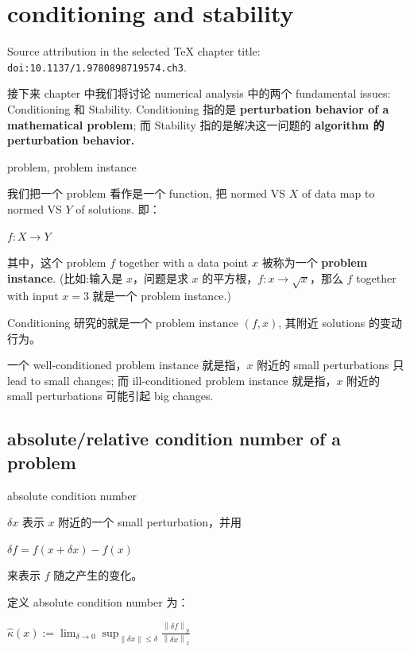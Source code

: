 \chapter{conditioning and stability}

Source attribution in the selected TeX chapter title: \texttt{doi:10.1137/1.9780898719574.ch3}.

接下来 chapter 中我们将讨论 numerical analysis 中的两个 fundamental issues: Conditioning 和 Stability. Conditioning 指的是 \textbf{perturbation behavior of a mathematical problem}; 而 Stability 指的是解决这一问题的 \textbf{algorithm 的 perturbation behavior.}

\begin{definition}{problem, problem instance}

我们把一个 problem 看作是一个 function, 把 normed VS \(X\) of data map to normed VS \(Y\) of solutions. 即：

\(f:X\rightarrow Y\)

其中，这个 problem \(f\) together with a data point \(x\) 被称为一个 \textbf{problem instance}. (比如:输入是 \(x\)，问题是求 \(x\) 的平方根，\(f:x\rightarrow\sqrt{x}\)，那么 \(f\) together with input \(x = 3\) 就是一个 problem instance.)

\end{definition}

Conditioning 研究的就是一个 problem instance \(\left( {f,x} \right)\), 其附近 solutions 的变动行为。

一个 well-conditioned problem instance 就是指，\(x\) 附近的 small perturbations 只 lead to small changes; 而 ill-conditioned problem instance 就是指，\(x\) 附近的 small perturbations 可能引起 big changes.

\section{absolute/relative condition number of a problem}

\begin{definition}{absolute condition number}

\(\delta x\) 表示 \(x\) 附近的一个 small perturbation，并用

\(\delta f = f\left( {x + \delta x} \right) - f(x)\)

来表示 \(f\) 随之产生的变化。

定义 absolute condition number 为：

\(\widehat{\kappa}(x) := \lim_{\delta\rightarrow 0}\sup_{{\|{\delta x}\|} \leq \delta}\frac{\left\| {\delta f} \right\|_{y}}{\left\| {\delta x} \right\|_{x}}\)

\end{definition}

